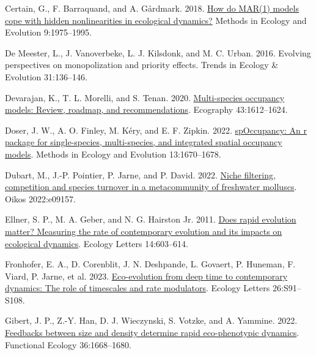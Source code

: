 \documentclass[
]{article}
\newlength{\cslhangindent}
\newlength{\cslentryspacingunit} %
\newenvironment{CSLReferences}[2] %
 {%
  \setlength{\parindent}{0pt}
  \ifodd #1
  \let\oldpar\par
  \def\par{\hangindent=\cslhangindent\oldpar}
  \fi
  \setlength{\parskip}{#2\cslentryspacingunit}
 }%
 {}
\begin{document}
\begin{CSLReferences}{0}{0}
\leavevmode{}%
Certain, G., F. Barraquand, and A. Gårdmark. 2018. \href{https://doi.org/10.1111/2041-210X.13021}{How do MAR(1) models cope with hidden nonlinearities in ecological dynamics?} Methods in Ecology and Evolution 9:1975--1995.

\leavevmode{}%
De Meester, L., J. Vanoverbeke, L. J. Kilsdonk, and M. C. Urban. 2016. Evolving perspectives on monopolization and priority effects. Trends in Ecology \& Evolution 31:136--146.

\leavevmode{}%
Devarajan, K., T. L. Morelli, and S. Tenan. 2020. \href{https://doi.org/10.1111/ecog.04957}{Multi-species occupancy models: Review, roadmap, and recommendations}. Ecography 43:1612--1624.

\leavevmode{}%
Doser, J. W., A. O. Finley, M. Kéry, and E. F. Zipkin. 2022. \href{https://doi.org/10.1111/2041-210X.13897}{spOccupancy: An r package for single-species, multi-species, and integrated spatial occupancy models}. Methods in Ecology and Evolution 13:1670--1678.

\leavevmode{}%
Dubart, M., J.-P. Pointier, P. Jarne, and P. David. 2022. \href{https://doi.org/10.1111/oik.09157}{Niche filtering, competition and species turnover in a metacommunity of freshwater molluscs}. Oikos 2022:e09157.

\leavevmode{}%
Ellner, S. P., M. A. Geber, and N. G. Hairston Jr. 2011. \href{https://doi.org/10.1111/j.1461-0248.2011.01616.x}{Does rapid evolution matter? Measuring the rate of contemporary evolution and its impacts on ecological dynamics}. Ecology Letters 14:603--614.

\leavevmode{}%
Fronhofer, E. A., D. Corenblit, J. N. Deshpande, L. Govaert, P. Huneman, F. Viard, P. Jarne, et al. 2023. \href{https://doi.org/10.1111/ele.14222}{Eco-evolution from deep time to contemporary dynamics: The role of timescales and rate modulators}. Ecology Letters 26:S91--S108.

\leavevmode{}%
Gibert, J. P., Z.-Y. Han, D. J. Wieczynski, S. Votzke, and A. Yammine. 2022. \href{https://doi.org/10.1111/1365-2435.14070}{Feedbacks between size and density determine rapid eco-phenotypic dynamics}. Functional Ecology 36:1668--1680.


\end{CSLReferences}
\end{document}
